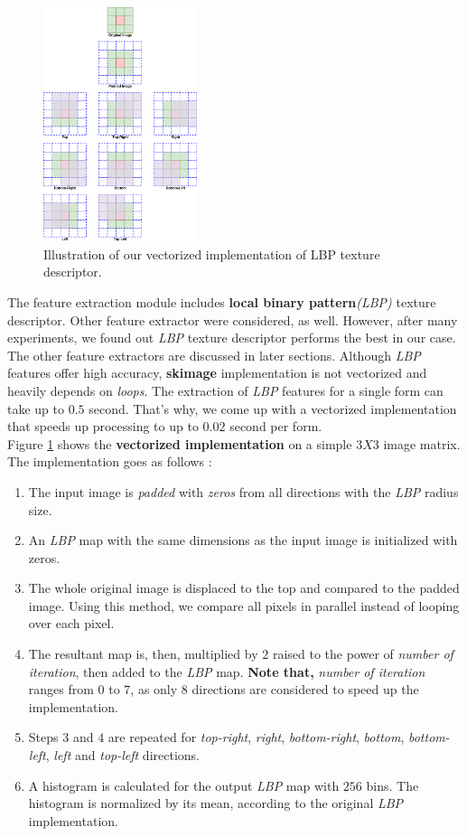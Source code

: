 \begin{figure}[h!]
    \centering
    \includegraphics[width=0.4\textwidth]{images/lbp.png}
    \caption{Illustration of our vectorized implementation of LBP texture descriptor.}
    \label{fig:lbp-implementation}
\end{figure}

The feature extraction module includes \textbf{local binary pattern}\emph{(LBP)} texture descriptor. Other feature extractor were considered, as well. However, after many experiments, we found out \emph{LBP} texture descriptor performs the best in our case. The other feature extractors are discussed in later sections. Although \emph{LBP} features offer high accuracy, \textbf{skimage} implementation is not vectorized and heavily depends on \emph{loops}. The extraction of \emph{LBP} features for a single form can take up to $0.5$ second. That's why, we come up with a vectorized implementation that speeds up processing to up to $0.02$ second per form. \\

Figure \ref{fig:lbp-implementation} shows the \textbf{vectorized implementation} on a simple $3X3$ image matrix. The implementation goes as follows :
\begin{enumerate}
    \item The input image is \emph{padded} with \emph{zeros} from all directions with the \emph{LBP} radius size.
    \item An \emph{LBP} map with the same dimensions as the input image is initialized with zeros.
    \item The whole original image is displaced to the top and compared to the padded image. Using this method, we compare all pixels in parallel instead of looping over each pixel.
    \item The resultant map is, then, multiplied by $2$ raised to the power of \emph{number of iteration}, then added to the \emph{LBP} map. \textbf{Note that,} \emph{number of iteration} ranges from $0$ to $7$, as only $8$ directions are considered to speed up the implementation.
    \item Steps $3$ and $4$ are repeated for \emph{top-right}, \emph{right}, \emph{bottom-right}, \emph{bottom}, \emph{bottom-left}, \emph{left} and \emph{top-left} directions.
    \item A histogram is calculated for the output \emph{LBP} map with $256$ bins. The histogram is normalized by its mean, according to the original \emph{LBP} implementation.
\end{enumerate}